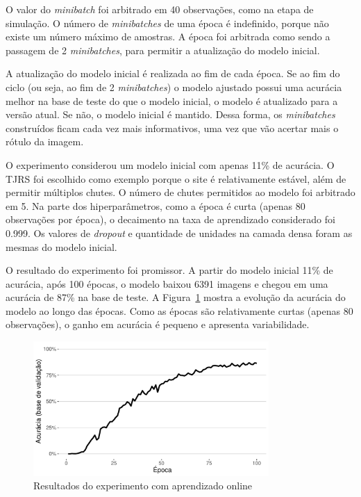\documentclass[12pt,twoside,brazilian]{book}
\begin{document}
O valor do \emph{minibatch} foi arbitrado em 40 observações, como na
etapa de simulação. O número de \emph{minibatches} de uma época é
indefinido, porque não existe um número máximo de amostras. A época foi
arbitrada como sendo a passagem de 2 \emph{minibatches}, para permitir a
atualização do modelo inicial.

A atualização do modelo inicial é realizada ao fim de cada época. Se ao
fim do ciclo (ou seja, ao fim de 2 \emph{minibatches}) o modelo ajustado
possui uma acurácia melhor na base de teste do que o modelo inicial, o
modelo é atualizado para a versão atual. Se não, o modelo inicial é
mantido. Dessa forma, os \emph{minibatches} construídos ficam cada vez
mais informativos, uma vez que vão acertar mais o rótulo da imagem.

O experimento considerou um modelo inicial com apenas 11\% de acurácia.
O TJRS foi escolhido como exemplo porque o site é relativamente estável,
além de permitir múltiplos chutes. O número de chutes permitidos ao
modelo foi arbitrado em 5. Na parte dos hiperparâmetros, como a época é
curta (apenas 80 observações por época), o decaimento na taxa de
aprendizado considerado foi 0.999. Os valores de \emph{dropout} e
quantidade de unidades na camada densa foram as mesmas do modelo
inicial.

O resultado do experimento foi promissor. A partir do modelo inicial
11\% de acurácia, após 100 épocas, o modelo baixou 6391 imagens e chegou
em uma acurácia de 87\% na base de teste. A
Figura~\ref{fig-online-learning} mostra a evolução da acurácia do modelo
ao longo das épocas. Como as épocas são relativamente curtas (apenas 80
observações), o ganho em acurácia é pequeno e apresenta variabilidade.

\begin{figure}

{\centering \includegraphics[width=0.8\textwidth,height=\textheight]{./resultados_files/figure-pdf/fig-online-learning-1.pdf}

}

\caption{\label{fig-online-learning}Resultados do experimento com
aprendizado online}

\end{figure}
\end{document}
